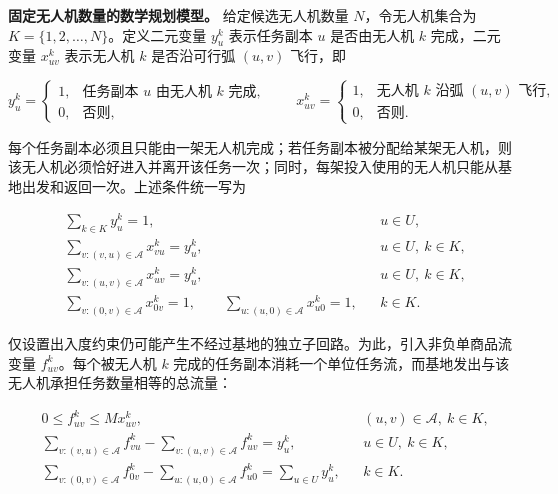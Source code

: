 \documentclass[UTF8,a4paper,12pt]{ctexart}
\numberwithin{equation}{section}
\numberwithin{equation}{section}
\begin{document}
\noindent\textbf{固定无人机数量的数学规划模型。}
给定候选无人机数量 \(N\)，令无人机集合为 \(K=\{1,2,\ldots,N\}\)。定义二元变量 \(y_u^k\) 表示任务副本 \(u\) 是否由无人机 \(k\) 完成，二元变量 \(x_{uv}^k\) 表示无人机 \(k\) 是否沿可行弧 \((u,v)\) 飞行，即

\[
y_u^k=
\begin{cases}
1, & \text{任务副本 }u\text{ 由无人机 }k\text{ 完成},\\
0, & \text{否则},
\end{cases}
\qquad
x_{uv}^k=
\begin{cases}
1, & \text{无人机 }k\text{ 沿弧 }(u,v)\text{ 飞行},\\
0, & \text{否则}.
\end{cases}
\]

每个任务副本必须且只能由一架无人机完成；若任务副本被分配给某架无人机，则该无人机必须恰好进入并离开该任务一次；同时，每架投入使用的无人机只能从基地出发和返回一次。上述条件统一写为

\begin{equation}
\begin{aligned}
  &\sum_{k\in K}y_u^k=1,
  &&u\in U,\\
  &\sum_{v:(v,u)\in\mathcal A}x_{vu}^k=y_u^k,
  &&u\in U,\ k\in K,\\
  &\sum_{v:(u,v)\in\mathcal A}x_{uv}^k=y_u^k,
  &&u\in U,\ k\in K,\\
  &\sum_{v:(0,v)\in\mathcal A}x_{0v}^k=1,
  \qquad
  \sum_{u:(u,0)\in\mathcal A}x_{u0}^k=1,
  &&k\in K.
\end{aligned}
\label{eq:q1-route-constraints}
\end{equation}

仅设置出入度约束仍可能产生不经过基地的独立子回路。为此，引入非负单商品流变量 \(f_{uv}^k\)。每个被无人机 \(k\) 完成的任务副本消耗一个单位任务流，而基地发出与该无人机承担任务数量相等的总流量：

\begin{equation}
\begin{aligned}
  &0\leq f_{uv}^k\leq Mx_{uv}^k,
  &&(u,v)\in\mathcal A,\ k\in K,\\
  &\sum_{v:(v,u)\in\mathcal A}f_{vu}^k
  -
  \sum_{v:(u,v)\in\mathcal A}f_{uv}^k
  =y_u^k,
  &&u\in U,\ k\in K,\\
  &\sum_{v:(0,v)\in\mathcal A}f_{0v}^k
  -
  \sum_{u:(u,0)\in\mathcal A}f_{u0}^k
  =
  \sum_{u\in U}y_u^k,
  &&k\in K.
\end{aligned}
\label{eq:q1-flow-constraints}
\end{equation}
\end{document}

